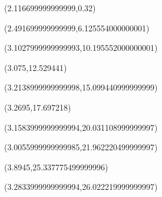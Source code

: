 \documentclass{article}
\begin{document}
\begin{textblock}{13}(2.116699999999999,0.32)\end{textblock}
\begin{textblock}{13}(2.491699999999999,6.125554000000001)\end{textblock}
\begin{textblock}{13}(3.1027999999999993,10.195552000000001)\end{textblock}
\begin{textblock}{13}(3.075,12.529441)\end{textblock}
\begin{textblock}{13}(3.2138999999999998,15.099440999999999)\end{textblock}
\begin{textblock}{13}(3.2695,17.697218)\end{textblock}
\begin{textblock}{13}(3.1583999999999994,20.031108999999997)\end{textblock}
\begin{textblock}{13}(3.0055999999999985,21.962220499999997)\end{textblock}
\begin{textblock}{13}(3.8945,25.337775499999996)\end{textblock}
\begin{textblock}{13}(3.2833999999999994,26.022219999999997)\end{textblock}
\end{document}
